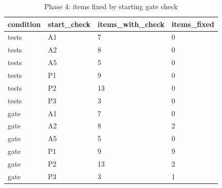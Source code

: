 \begin{table}[t]
\centering
\caption{Phase 4: items fixed by starting gate check}
\small
\begin{tabular}{llll}
\hline
condition & start\_check & items\_with\_check & items\_fixed \\
\hline
tests & A1 & 7 & 0 \\
tests & A2 & 8 & 0 \\
tests & A5 & 5 & 0 \\
tests & P1 & 9 & 0 \\
tests & P2 & 13 & 0 \\
tests & P3 & 3 & 0 \\
gate & A1 & 7 & 0 \\
gate & A2 & 8 & 2 \\
gate & A5 & 5 & 0 \\
gate & P1 & 9 & 9 \\
gate & P2 & 13 & 2 \\
gate & P3 & 3 & 1 \\
\hline
\end{tabular}
\end{table}
